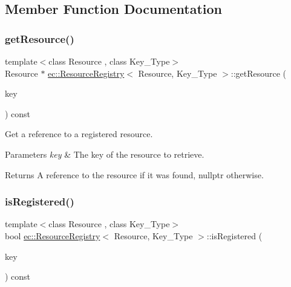 \subsection{Member Function Documentation}
\mbox{\label{classec_1_1_resource_registry_a8ec3d2c20682a59f944fcf145e23103e}} 
\subsubsection{\texorpdfstring{get\+Resource()}{getResource()}}
{\footnotesize\ttfamily template$<$class Resource , class Key\+\_\+\+Type$>$ \\
Resource $\ast$ \mbox{\hyperlink{classec_1_1_resource_registry}{ec\+::\+Resource\+Registry}}$<$ Resource, Key\+\_\+\+Type $>$\+::get\+Resource (\begin{DoxyParamCaption}\item[{const Key\+\_\+\+Type \&}]{key }\end{DoxyParamCaption}) const}



Get a reference to a registered resource. 


\begin{DoxyParams}{Parameters}
{\em key} & The key of the resource to retrieve. \\
\hline
\end{DoxyParams}
\begin{DoxyReturn}{Returns}
A reference to the resource if it was found, nullptr otherwise. 
\end{DoxyReturn}
\mbox{\label{classec_1_1_resource_registry_afe08f6227ad0e2263b65a807cef44cf4}} 
\subsubsection{\texorpdfstring{is\+Registered()}{isRegistered()}\hspace{0.1cm}{\footnotesize\ttfamily [1/2]}}
{\footnotesize\ttfamily template$<$class Resource , class Key\+\_\+\+Type$>$ \\
bool \mbox{\hyperlink{classec_1_1_resource_registry}{ec\+::\+Resource\+Registry}}$<$ Resource, Key\+\_\+\+Type $>$\+::is\+Registered (\begin{DoxyParamCaption}\item[{const Key\+\_\+\+Type \&}]{key }\end{DoxyParamCaption}) const}



